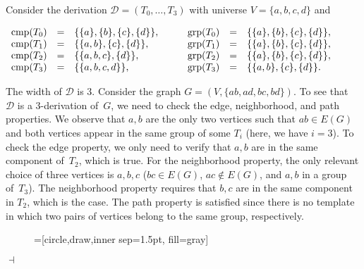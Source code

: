 \documentclass[10pt,usletter]{article}
\newenvironment{myquote}{\begin{center}
    \begin{minipage}{.80\linewidth}}{\end{minipage}\end{center}}
\theoremstyle{remark}
\newtheorem{example}{Example}
\renewenvironment{example}{\begin{ex}}{\hfill
    $\dashv$\end{ex}\medskip}
\newcommand{\DDD}{\mathcal{D}}
\newcommand{\hy}{\hbox{-}\nobreak\hskip0pt}
\newcommand{\comps}{\text{cmp}}
\newcommand{\groups}{\text{grp}}
\begin{document}
\begin{example}\label{ex:derivation}
  Consider the derivation $\DDD=(T_0,\dots,T_3)$ with
  universe $V=\{a,b,c,d\}$ and
\begin{myquote}
  $\begin{array}[b]{lclclcl}
    \comps(T_0)&=&\{\{a\},\{b\},\{c\},\{d\}\}, 
    & \quad & 
    \groups(T_0)&=& \{\{a\},\{b\},\{c\},\{d\}\}, \\  
\comps(T_1)&=&\{\{a,b\},\{c\},\{d\}\}, 
    & \quad & 
    \groups(T_1)&=&\{\{a\},\{b\},\{c\},\{d\}\},\\ 
\comps(T_2)&=&\{\{a,b,c\},\{d\}\}, 
    & \quad & 
    \groups(T_2)&=& \{\{a\},\{b\},\{c\},\{d\}\}, \\  
\comps(T_3)&=&\{\{a,b,c,d\}\}, 
    & \quad & 
    \groups(T_3)&=& \{\{a,b\},\{c\},\{d\}\}.  
  \end{array}$ \end{myquote}
The width of $\DDD$ is $3$.  Consider the graph
$G=(V,\{ab,ad,bc,bd\})$. To see that~$\DDD$ is a $3$\hy derivation
of~$G$, we need to check the edge, neighborhood, and path
properties. We observe that $a,b$ are the only two vertices such that
$ab\in E(G)$ and both vertices appear in the same group of some $T_i$
(here, we have $i=3$).  To check the edge property, we
only need to verify that $a,b$ are in the same component of~$T_2$,
which is true. For the neighborhood property, the only
relevant choice of three vertices is $a,b,c$ ($bc\in E(G)$, $ac\notin
E(G)$, and $a,b$ in a group of~$T_3$). The neighborhood
property requires that $b,c$ are in the same component in $T_2$, which
is the case.  The path property is satisfied since there is no
template in which two pairs of vertices belong to the same group,
respectively.


\begin{figure}[ht]
\centering
 =[circle,draw,inner sep=1.5pt, fill=gray]



\end{figure}
\end{example}
\end{document}

